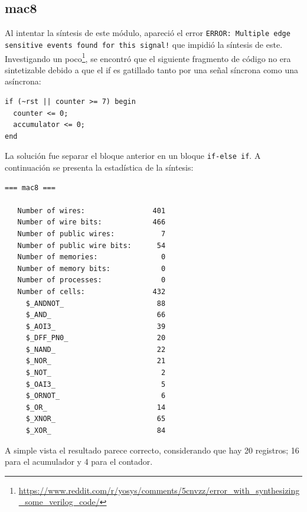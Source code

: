\documentclass[letterpaper, 12pt]{article}
\numberwithin{equation}{section}
\begin{document}
\subsection{mac8}

Al intentar la síntesis de este módulo, apareció el error \texttt{ERROR: Multiple edge sensitive events found for this signal!} que impidió la síntesis de este. Investigando un poco\footnote{\url{https://www.reddit.com/r/yosys/comments/5cnvzz/error_with_synthesizing_some_verilog_code/}}, se encontró que el siguiente fragmento de código no era sintetizable debido a que el if es gatillado tanto por una señal síncrona como una asíncrona:

\begin{verbatim}
if (~rst || counter >= 7) begin
  counter <= 0;
  accumulator <= 0;
end
\end{verbatim}

La solución fue separar el bloque anterior en un bloque \texttt{if-else if}. A continuación se presenta la estadística de la síntesis:

\begin{verbatim}
=== mac8 ===

   Number of wires:                401
   Number of wire bits:            466
   Number of public wires:           7
   Number of public wire bits:      54
   Number of memories:               0
   Number of memory bits:            0
   Number of processes:              0
   Number of cells:                432
     $_ANDNOT_                      88
     $_AND_                         66
     $_AOI3_                        39
     $_DFF_PN0_                     20
     $_NAND_                        22
     $_NOR_                         21
     $_NOT_                          2
     $_OAI3_                         5
     $_ORNOT_                        6
     $_OR_                          14
     $_XNOR_                        65
     $_XOR_                         84
\end{verbatim}

A simple vista el resultado parece correcto, considerando que hay 20 registros; 16 para el acumulador y 4 para el contador.
\end{document}
